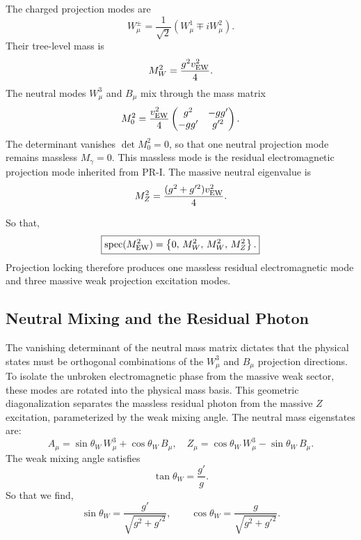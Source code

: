 \documentclass[11pt]{article}
\begin{document}
The charged projection modes are
\begin{equation}
W_\mu^\pm
=
\frac{1}{\sqrt2}
\left(
W_\mu^1
\mp
iW_\mu^2
\right).
\end{equation}
Their tree-level mass is
\begin{equation}
M_W^2
=
\frac{g^2v_{\rm EW}^2}{4}.
\end{equation}
The neutral modes \(W_\mu^3\) and \(B_\mu\) mix through the mass matrix
\begin{equation}
M_0^2
=
\frac{v_{\rm EW}^2}{4}
\begin{pmatrix}
g^2 & -gg'\\
-gg' & g'^2
\end{pmatrix}.
\end{equation}
The determinant vanishes $\det M_0^2=0$, so that one neutral projection mode remains massless $M_\gamma=0$. This massless mode is the residual electromagnetic projection mode inherited from PR-I. The massive neutral eigenvalue is
\begin{equation}
M_Z^2
=
\frac{
(g^2+g'^2)v_{\rm EW}^2
}{4}.
\end{equation}

So that,
\begin{equation}
\boxed{
{\rm spec}(M_{\rm EW}^2)
=
\left\{
0,\,
M_W^2,\,
M_W^2,\,
M_Z^2
\right\}.
}
\end{equation}
Projection locking therefore produces one massless residual electromagnetic mode and three massive weak projection excitation modes.

\subsection{Neutral Mixing and the Residual Photon}
\label{sec:pr2_neutral_mixing_residual_photon}
The vanishing determinant of the neutral mass matrix dictates that the physical states must be orthogonal combinations of the $W^3_\mu$ and $B_\mu$ projection directions. To isolate the unbroken electromagnetic phase from the massive weak sector, these modes are rotated into the physical mass basis. This geometric diagonalization separates the massless residual photon from the massive $Z$ excitation, parameterized by the weak mixing angle. The neutral mass eigenstates are:
\begin{equation}
A_\mu
=
\sin\theta_W\,W_\mu^3
+
\cos\theta_W\,B_\mu,
\quad
Z_\mu
=
\cos\theta_W\,W_\mu^3
-
\sin\theta_W\,B_\mu.
\end{equation}
The weak mixing angle satisfies
\begin{equation}
\tan\theta_W
=
\frac{g'}{g}.
\end{equation}
So that we find,
\begin{equation}
\boxed{
\sin\theta_W
=
\frac{g'}{\sqrt{g^2+g'^2}},
\qquad
\cos\theta_W
=
\frac{g}{\sqrt{g^2+g'^2}}.
}
\end{equation}
\end{document}
